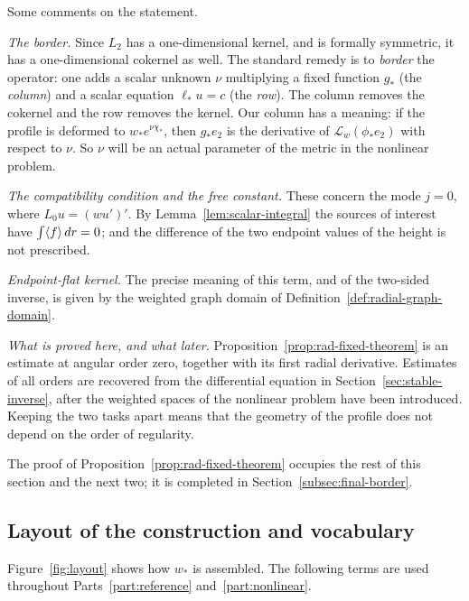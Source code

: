 Some comments on the statement.

\emph{The border.} Since $L_2$ has a one-dimensional kernel, and is
formally symmetric, it has a one-dimensional cokernel as well. The
standard remedy is to \emph{border} the operator: one adds a scalar
unknown $\nu$ multiplying a fixed function $g_*$ (the \emph{column})
and a scalar equation $\ell_*u=c$ (the \emph{row}). The column removes
the cokernel and the row removes the kernel. Our column has a
meaning: if the profile is deformed to $w_*e^{\nu\chi_*}$, then
$g_*e_2$ is the derivative of
$\mathscr L_w(\phi_*e_2)$ with respect to $\nu$. So $\nu$ will be an
actual parameter of the metric in the nonlinear problem.

\emph{The compatibility condition and the free constant.} These
concern the mode $j=0$, where $L_0u=(wu')'$. By
Lemma~\ref{lem:scalar-integral} the sources of interest have
$\int\langle f\rangle\,dr=0$; and the difference of the two endpoint values of
the height is not prescribed.

\emph{Endpoint-flat kernel.} The precise meaning of this term, and of
the two-sided inverse, is given by the weighted graph domain of
Definition~\ref{def:radial-graph-domain}.

\emph{What is proved here, and what later.}
Proposition~\ref{prop:rad-fixed-theorem} is an estimate at angular
order zero, together with its first radial derivative. Estimates of
all orders are recovered from the differential equation in
Section~\ref{sec:stable-inverse}, after the weighted spaces of the
nonlinear problem have been introduced. Keeping the two tasks apart
means that the geometry of the profile does not depend on the order
of regularity.

The proof of Proposition~\ref{prop:rad-fixed-theorem} occupies the
rest of this section and the next two; it is completed in
Section~\ref{subsec:final-border}.

\subsection{Layout of the construction and vocabulary}
\label{subsec:layout}

Figure~\ref{fig:layout} shows how $w_*$ is assembled. The following
terms are used throughout Parts~\ref{part:reference}
and~\ref{part:nonlinear}.

